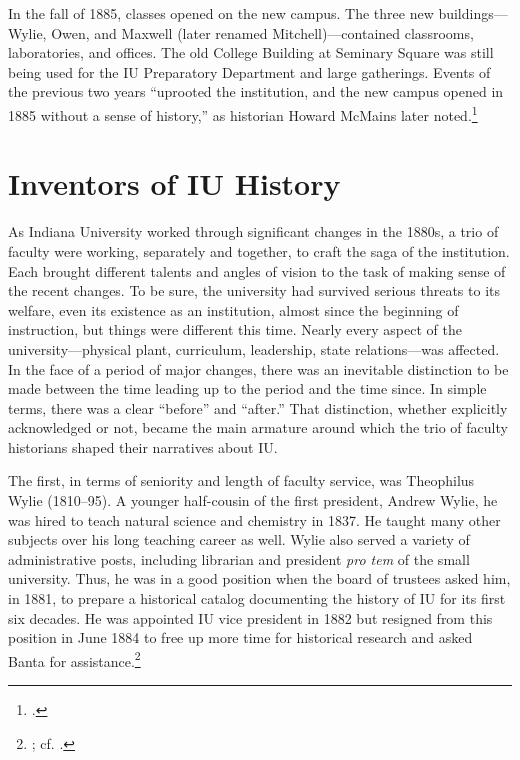 \documentclass[
  american,
  letterpaper,
]{scrreprt}
\begin{document}
In the fall of 1885, classes opened on the new campus. The three new
buildings---Wylie, Owen, and Maxwell (later renamed
Mitchell)---contained classrooms, laboratories, and offices. The old
College Building at Seminary Square was still being used for the IU
Preparatory Department and large gatherings. Events of the previous two
years ``uprooted the institution, and the new campus opened in 1885
without a sense of history,'' as historian Howard McMains later
noted.\footnote{.}

\section{Inventors of IU History}\label{inventors-of-iu-history}

As Indiana University worked through significant changes in the 1880s, a
trio of faculty were working, separately and together, to craft the saga
of the institution. Each brought different talents and angles of vision
to the task of making sense of the recent changes. To be sure, the
university had survived serious threats to its welfare, even its
existence as an institution, almost since the beginning of instruction,
but things were different this time. Nearly every aspect of the
university---physical plant, curriculum, leadership, state
relations---was affected. In the face of a period of major changes,
there was an inevitable distinction to be made between the time leading
up to the period and the time since. In simple terms, there was a clear
``before'' and ``after.'' That distinction, whether explicitly
acknowledged or not, became the main armature around which the trio of
faculty historians shaped their narratives about IU.

The first, in terms of seniority and length of faculty service, was
Theophilus Wylie (1810--95). A younger half-cousin of the first
president, Andrew Wylie, he was hired to teach natural science and
chemistry in 1837. He taught many other subjects over his long teaching
career as well. Wylie also served a variety of administrative posts,
including librarian and president \emph{pro tem} of the small
university. Thus, he was in a good position when the board of trustees
asked him, in 1881, to prepare a historical catalog documenting the
history of IU for its first six decades. He was appointed IU vice
president in 1882 but resigned from this position in June 1884 to free
up more time for historical research and asked Banta for
assistance.\footnote{;
  cf. .}
\end{document}

